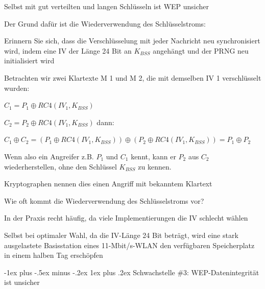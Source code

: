 \documentclass[a4paper]{article}
\makeatletter
\renewcommand{\subsubsection}{\@startsection{subsubsection}{3}{0mm}%
 {-1ex plus -.5ex minus -.2ex}%
 {1ex plus .2ex}%
 {\normalfont\small\bfseries}}
\makeatother
\begin{document}
\begin{multicols}{3}
      \begin{itemize*}
            \item Selbst mit gut verteilten und langen Schlüsseln ist WEP unsicher
            \item Der Grund dafür ist die Wiederverwendung des Schlüsselstroms:
            \begin{itemize*}
                  \item Erinnern Sie sich, dass die Verschlüsselung mit jeder Nachricht neu synchronisiert wird, indem eine IV der Länge 24 Bit an $K_{BSS}$ angehängt und der PRNG neu initialisiert wird
                  \item Betrachten wir zwei Klartexte M 1 und M 2, die mit demselben IV 1 verschlüsselt wurden:
                  \begin{itemize*} \item $C_1 = P_1 \oplus RC4 (IV_1 , K_{BSS})$ \item $C_2 = P_2 \oplus RC4 (IV_1 , K_{BSS})$ dann: \item $C_1 \oplus C_2 = (P_1 \oplus RC4 (IV_1, K_{BSS})) \oplus (P_2\oplus RC4 (IV_1 , K_{BSS})) = P_1 \oplus P_2$ \end{itemize*}
                  \item Wenn also ein Angreifer z.B. $P_1$ und $C_1$ kennt, kann er $P_2$ aus $C_2$ wiederherstellen, ohne den Schlüssel $K_{BSS}$ zu kennen.
                  \begin{itemize*} \item Kryptographen nennen dies einen Angriff mit bekanntem Klartext \end{itemize*}
            \end{itemize*}
            \item Wie oft kommt die Wiederverwendung des Schlüsselstroms vor?
            \begin{itemize*}
                  \item In der Praxis recht häufig, da viele Implementierungen die IV schlecht wählen
                  \item Selbst bei optimaler Wahl, da die IV-Länge 24 Bit beträgt, wird eine stark ausgelastete Basisstation eines 11-Mbit/s-WLAN den verfügbaren Speicherplatz in einem halben Tag erschöpfen
            \end{itemize*}
      \end{itemize*}


      \subsubsection{Schwachstelle \#3: WEP-Datenintegrität ist
            unsicher}


\end{multicols}
\end{document}
